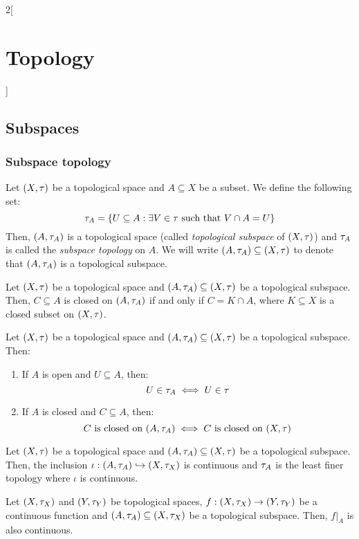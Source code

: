\documentclass[../../../main.tex]{subfiles}
\begin{document}
\begin{multicols}{2}[\section{Topology}]
  \subsection{Subspaces}
  \subsubsection{Subspace topology}
  \begin{definition}
    Let $(X,\tau)$ be a topological space and $A\subseteq X$ be a subset. We define the following set: $$\tau_A=\{U\subseteq A:\exists V\in\tau\text{ such that }V\cap A=U\}$$ Then, $(A,\tau_A)$ is a topological space (called \emph{topological subspace} of $(X,\tau)$) and $\tau_A$ is called the \emph{subspace topology} on $A$. We will write $(A,\tau_A)\subseteq (X,\tau)$ to denote that $(A,\tau_A)$ is a topological subspace.
  \end{definition}
  \begin{prop}
    Let $(X,\tau)$ be a topological space and $(A,\tau_A)\subseteq (X,\tau)$ be a topological subspace. Then, $C\subseteq A$ is closed on $(A,\tau_A)$ if and only if $C=K\cap A$, where $K\subseteq X$ is a closed subset on $(X,\tau)$.
  \end{prop}
  \begin{prop}
    Let $(X,\tau)$ be a topological space and $(A,\tau_A)\subseteq (X,\tau)$ be a topological subspace. Then:
    \begin{enumerate}
      \item If $A$ is open and $U\subseteq A$, then: $$U\in\tau_A\iff U\in\tau$$
      \item If $A$ is closed and $C\subseteq A$, then: $$C\text{ is closed on }(A,\tau_A)\iff C\text{ is closed on }(X,\tau)$$
    \end{enumerate}
  \end{prop}
  \begin{prop}
    Let $(X,\tau)$ be a topological space and $(A,\tau_A)\subseteq (X,\tau)$ be a topological subspace. Then, the inclusion $\iota:(A,\tau_A)\hookrightarrow (X,\tau_X)$ is continuous and $\tau_A$ is the least finer topology where $\iota$ is continuous.
  \end{prop}
  \begin{corollary}
    Let $(X,\tau_X)$ and $(Y,\tau_Y)$ be topological spaces, $f:(X,\tau_X)\rightarrow (Y,\tau_Y)$ be a continuous function and $(A,\tau_A)\subseteq (X,\tau_X)$ be a topological subspace. Then, $f|_A$ is also continuous.
  \end{corollary}

\end{multicols}
\end{document}
